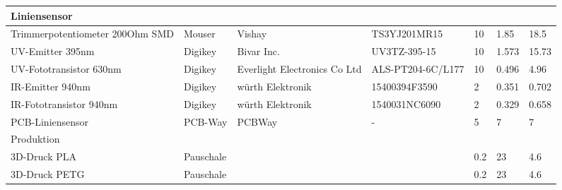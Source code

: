 \documentclass[main.tex]{subfiles} %
\begin{document}
\begin{table}[h]
{\begin{tabular}{|p{3cm}|p{2.5cm}|p{2.5cm}|p{3cm}|p{1cm}|p{1.5cm}|p{1cm}|}
            \rowcolor{lightgray} Liniensensor &                    &                              &                         &                 &                           &                             \\ \hline
            Trimmerpotentiometer 200Ohm SMD   & Mouser             & Vishay                       & TS3YJ201MR15            & 10              & 1.85                      & 18.5                        \\ \hline
            UV-Emitter 395nm                  & Digikey            & Bivar Inc.                   & UV3TZ-395-15            & 10              & 1.573                     & 15.73                       \\ \hline
            UV-Fototransistor 630nm           & Digikey            & Everlight Electronics Co Ltd & ALS-PT204-6C/L177       & 10              & 0.496                     & 4.96                        \\ \hline
            IR-Emitter 940nm                  & Digikey            & würth Elektronik             & 15400394F3590           & 2               & 0.351                     & 0.702                       \\ \hline
            IR-Fototransistor 940nm           & Digikey            & würth Elektronik             & 1540031NC6090           & 2               & 0.329                     & 0.658                       \\ \hline
            PCB-Liniensensor                  & PCB-Way            & PCBWay                       & -                       & 5               & 7                         & 7                           \\ \hline
            \rowcolor{lightgray} Produktion   &                    &                              &                         &                 &                           &                             \\ \hline
            3D-Druck PLA                      & Pauschale          &                              &                         & 0.2             & 23                        & 4.6                         \\ \hline
            3D-Druck PETG                     & Pauschale          &                              &                         & 0.2             & 23                        & 4.6                         \\ \hline


\end{tabular}}
\end{table}
\end{document}
